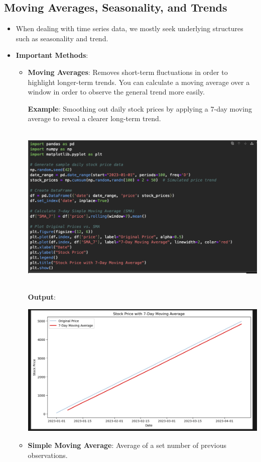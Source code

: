 \documentclass{article}
\begin{document}
\subsection{Moving Averages, Seasonality, and Trends}
\begin{itemize}
\item When dealing with time series data, we mostly seek underlying structures such as seasonality and trend.
\item \textbf{Important Methods}:
\begin{itemize}
\item \textbf{Moving Averages}: Removes short-term fluctuations in order to highlight longer-term trends. You can calculate a moving average over a window in order to observe the general trend more easily.

\textbf{Example}: Smoothing out daily stock prices by applying a 7-day moving average to reveal a clearer long-term trend.

\includegraphics[width=14cm,height=8cm]{Moving Averages.png}

\textbf{Output}:

\includegraphics[width=14cm,height=8
cm]{Moving Averages_Output.png}
\newpage
\item \textbf{Simple Moving Average}: Average of a set number of previous observations.


\end{itemize}
\end{itemize}
\end{document}

